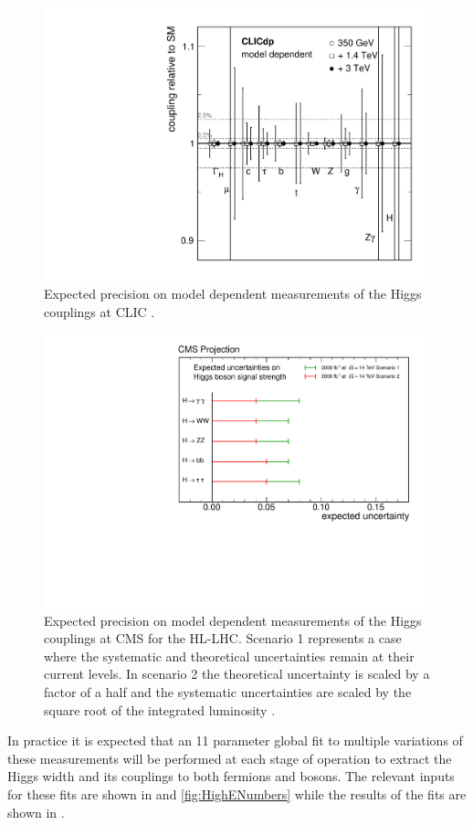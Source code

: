 \begin{figure}
\centering
\includegraphics[width=0.65\linewidth]{Theory/fig/FitResultsMD.pdf}
\caption[Expected precision on model dependent measurements of the Higgs couplings at CLIC]{Expected precision on model dependent measurements of the Higgs couplings at CLIC \cite{Abramowicz:2016zbo}.}
\label{fig:modelDependentCouplings}
\end{figure}

\begin{figure}
\centering
\includegraphics[width=0.7\linewidth]{Theory/fig/MuSnowmass3000.pdf}
\caption[Expected precision on model dependent measurements of the Higgs couplings at CMS]{Expected precision on model dependent measurements of the Higgs couplings at \ac{CMS} for the \ac{HL-LHC}. Scenario 1 represents a case where the systematic and theoretical uncertainties remain at their current levels. In scenario 2 the theoretical uncertainty is scaled by a factor of a half and the systematic uncertainties are scaled by the square root of the integrated luminosity \cite{CMS:2013xfa}.}
\label{fig:CMSHiggsPredictions}
\end{figure}

In practice it is expected that an 11 parameter global fit to multiple variations of these measurements will be performed at each stage of operation to extract the Higgs width and its couplings to both fermions and bosons. The relevant inputs for these fits are shown in  and \ref{fig:HighENumbers} while the results of the fits are shown in .

